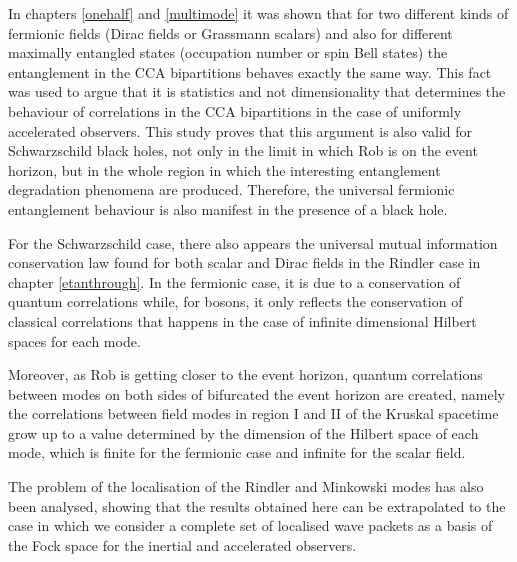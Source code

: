 In chapters \ref{onehalf} and \ref{multimode} it was shown that for two different kinds of fermionic
fields (Dirac fields or Grassmann scalars) and also for different
maximally entangled states (occupation number or spin Bell states) the
entanglement in the CCA bipartitions behaves exactly the same way. This
fact was used to argue that  it is statistics and not dimensionality that
determines  the behaviour  of correlations in the CCA bipartitions in the
case of uniformly accelerated observers. This study
proves that this argument is also valid for Schwarzschild black holes, not
only in the limit in which Rob is on the event horizon, but in the whole
region in which the interesting entanglement degradation phenomena are produced.
Therefore, the universal fermionic entanglement behaviour is also manifest
in the presence of a black hole.

For the Schwarzschild case, there also appears the  universal mutual
information conservation law found for both scalar and Dirac fields in
the Rindler case in chapter \ref{etanthrough}. In the fermionic case, it is due to a
conservation of quantum correlations while, for bosons, it only reflects
the conservation of classical correlations  that happens in the case of
infinite dimensional Hilbert spaces for each mode.

Moreover, as Rob is getting closer to the event horizon, quantum
correlations between modes on both sides of bifurcated the event horizon are
created, namely the correlations between field modes in region I and II
of the Kruskal spacetime grow up to a value determined by the dimension
of the Hilbert space of each mode, which is finite for the fermionic case
and infinite for the scalar field.


The problem of the localisation of the Rindler and Minkowski modes has also been analysed, showing that the results obtained here can be extrapolated to the case in which we consider a complete set of localised wave packets as a basis of the Fock space for the inertial and accelerated observers.


